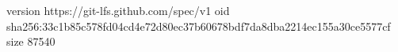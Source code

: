 version https://git-lfs.github.com/spec/v1
oid sha256:33c1b85c578fd04cd4e72d80ec37b60678bdf7da8dba2214ec155a30ce5577cf
size 87540

